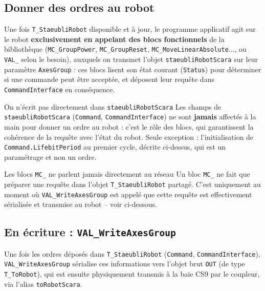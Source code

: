\subsection{Donner des ordres au robot}

Une fois \texttt{T\_StaeubliRobot} disponible et à jour, le programme
applicatif agit sur le robot \textbf{exclusivement en appelant des blocs
fonctionnels} de la bibliothèque (\texttt{MC\_GroupPower},
\texttt{MC\_GroupReset}, \texttt{MC\_MoveLinearAbsolute}..., ou
\texttt{VAL\_} selon le besoin), auxquels on transmet l'objet
\texttt{staeubliRobotScara} sur leur paramètre \texttt{AxesGroup} : ces
blocs lisent son état courant (\texttt{Status}) pour déterminer si une
commande peut être acceptée, et déposent leur requête dans
\texttt{CommandInterface} en conséquence.

\begin{UPSTIwarning}{On n'écrit pas directement dans \texttt{staeubliRobotScara}}
Les champs de \texttt{staeubliRobotScara} (\texttt{Command},
\texttt{CommandInterface}) ne sont \textbf{jamais} affectés à la main pour
donner un ordre au robot : c'est le rôle des blocs, qui garantissent la
cohérence de la requête avec l'état du robot. Seule exception :
l'initialisation de \texttt{Command.LifebitPeriod} au premier cycle,
décrite ci-dessus, qui est un paramétrage et non un ordre.
\end{UPSTIwarning}

\begin{UPSTIwarning}{Les blocs \texttt{MC\_} ne \og parlent\fg{} jamais directement au réseau}
Un bloc \texttt{MC\_} ne fait que préparer une requête dans l'objet
\texttt{T\_StaeubliRobot} partagé. C'est uniquement au moment où
\texttt{VAL\_WriteAxesGroup} est appelé que cette requête est
effectivement sérialisée et transmise au robot -- voir ci-dessous.
\end{UPSTIwarning}

\subsection{En écriture : \texttt{VAL\_WriteAxesGroup}}

Une fois les ordres déposés dans \texttt{T\_StaeubliRobot}
(\texttt{Command}, \texttt{CommandInterface}), \texttt{VAL\_WriteAxesGroup}
sérialise ces informations vers l'objet brut \texttt{OUT} (de type
\texttt{T\_ToRobot}), qui est ensuite physiquement transmis à la baie CS9
par le coupleur, via l'alias \texttt{toRobotScara}.

